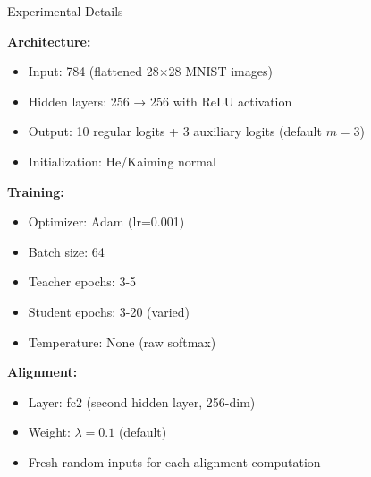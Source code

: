 \documentclass{beamer}
\begin{document}
\appendix

\begin{frame}[allowframebreaks]{Experimental Details}

\textbf{Architecture:}
\begin{itemize}
    \item Input: 784 (flattened 28×28 MNIST images)
    \item Hidden layers: 256 → 256 with ReLU activation
    \item Output: 10 regular logits + 3 auxiliary logits (default $m=3$)
    \item Initialization: He/Kaiming normal
\end{itemize}

\vspace{0.5em}

\textbf{Training:}
\begin{itemize}
    \item Optimizer: Adam (lr=0.001)
    \item Batch size: 64
    \item Teacher epochs: 3-5
    \item Student epochs: 3-20 (varied)
    \item Temperature: None (raw softmax)
\end{itemize}

\vspace{0.5em}

\textbf{Alignment:}
\begin{itemize}
    \item Layer: fc2 (second hidden layer, 256-dim)
    \item Weight: $\lambda = 0.1$ (default)
    \item Fresh random inputs for each alignment computation
\end{itemize}

\end{frame}
\end{document}

